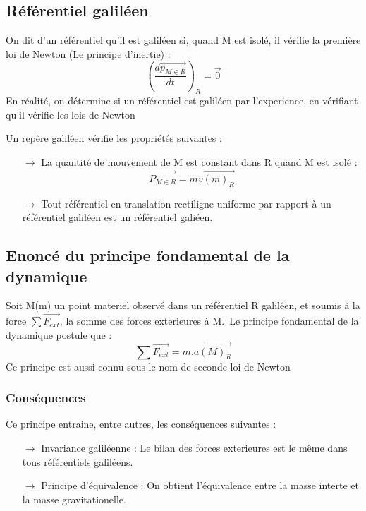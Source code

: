 \subsection{Référentiel galiléen}
\begin{de}
On dit d'un référentiel qu'il est galiléen si, quand M est isolé, il vérifie la première loi de Newton (Le principe d'inertie) : $$\left(\dfrac{d\overrightarrow{p_{M \in R}}}{dt}\right)_R = \overrightarrow{0}$$
En réalité, on détermine si un référentiel est galiléen par l'experience, en vérifiant qu'il vérifie les lois de Newton
\end{de}
Un repère galiléen vérifie les propriétés suivantes :
\begin{itemize}
 \item[$\rightarrow$] La quantité de mouvement de M est constant dans R quand M est isolé : $$\overrightarrow{P_{M \in R}}=m\overrightarrow{v(m)_R}$$
 \item[$\rightarrow$] Tout référentiel en translation rectiligne uniforme par rapport à un référentiel galiléen est un référentiel galiéen.
\end{itemize}
\subsection{Enoncé du principe fondamental de la dynamique}
Soit M(m) un point materiel observé dans un référentiel R galiléen, et soumis à la force $\sum \overrightarrow{F_{ext}}$, la somme des forces exterieures à M.\
Le principe fondamental de la dynamique postule que :
$$\sum \overrightarrow{F_{ext}} = m.\overrightarrow{a(M)_R}$$
Ce principe est aussi connu sous le nom de seconde loi de Newton
\subsubsection{Conséquences}
Ce principe entraine, entre autres, les conséquences suivantes :
\begin{itemize}
\item[$\rightarrow$] Invariance galiléenne : Le bilan des forces exterieures est le même dans tous référentiels galiléens.
\item[$\rightarrow$] Principe d'équivalence : On obtient l'équivalence entre la masse interte et la masse gravitationelle.
\end{itemize}
